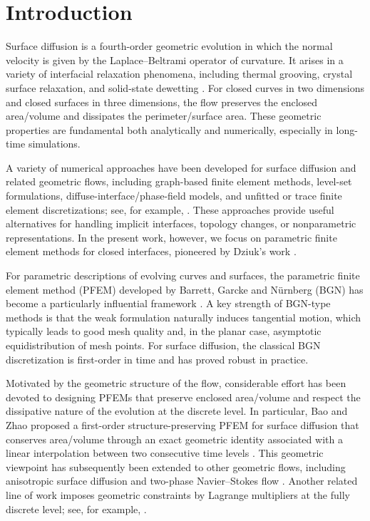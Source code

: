 \documentclass[smallextended]{svjour3}
\numberwithin{equation}{section}
\begin{document}
	\section{Introduction}
	
	Surface diffusion is a fourth-order geometric evolution in which the normal velocity is given by the Laplace--Beltrami operator of curvature. It arises in a variety of interfacial relaxation phenomena, including thermal grooving, crystal surface relaxation, and solid-state dewetting \cite{mullins1957thermal,mullins1959flattening,cahn1994surface}. For closed curves in two dimensions and closed surfaces in three dimensions, the flow preserves the enclosed area/volume and dissipates the perimeter/surface area. These geometric properties are fundamental both analytically and numerically, especially in long-time simulations.
	
	A variety of numerical approaches have been developed for surface diffusion and related geometric flows, including graph-based finite element methods, level-set formulations, diffuse-interface/phase-field models, and unfitted or trace finite element discretizations; see, for example, \cite{deckelnick2005fully,smereka2003semi,elliott1996cahn,olshanskii2018trace,xu2009ldg}. These approaches provide useful alternatives for handling implicit interfaces, topology changes, or nonparametric representations. In the present work, however, we focus on parametric finite element methods for closed interfaces, pioneered by Dziuk's work \cite{dziuk1994convergence,bansch2004surface,dziuk1990algorithm,dziuk2002evolution}.
	
For parametric descriptions of evolving curves and surfaces, the parametric finite element method (PFEM) developed by Barrett, Garcke and N\"urnberg (BGN) has become a particularly influential framework \cite{barrett2007parametric,barrett2008parametric1,barrett2020parametric}. A key strength of BGN-type methods is that the weak formulation naturally induces tangential motion, which typically leads to good mesh quality and, in the planar case, asymptotic equidistribution of mesh points. For surface diffusion, the classical BGN discretization is first-order in time and has proved robust in practice.

Motivated by the geometric structure of the flow, considerable effort has been devoted to designing PFEMs that preserve enclosed area/volume and respect the dissipative nature of the evolution at the discrete level. In particular, Bao and Zhao proposed a first-order structure-preserving PFEM for surface diffusion that conserves area/volume through an exact geometric identity associated with a linear interpolation between two consecutive time levels \cite{bao2021structure}. This geometric viewpoint has subsequently been extended to other geometric flows, including anisotropic surface diffusion and two-phase Navier--Stokes flow \cite{Bao2023Symmetrized,bao2023symmetrized1,bao2025unified,garcke2023structure}. Another related line of work imposes geometric constraints by Lagrange multipliers at the fully discrete level; see, for example, \cite{garcke2025structure}.
\end{document}
